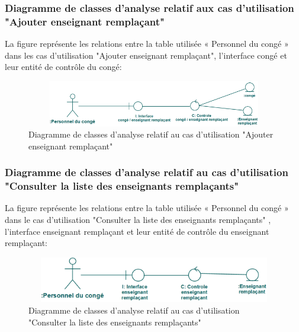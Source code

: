 \documentclass[12 pt ]{report}
\begin{document}
\subsubsection{Diagramme de classes d’analyse relatif aux cas d’utilisation "Ajouter enseignant remplaçant" }
La figure  représente les relations entre la table utilisée « Personnel du congé » dans les cas d’utilisation  "Ajouter enseignant remplaçant", l’interface  congé et  leur entité de  contrôle du congé:
\begin{figure}[h]
\begin{center}
\includegraphics[width= 12cm , height =2cm]{cla_con_rem.png}
\caption{Diagramme de classes d’analyse relatif au cas d’utilisation  "Ajouter enseignant remplaçant"}
\end{center}
\end{figure}
\newpage
\subsubsection{Diagramme de classes d’analyse relatif au cas d’utilisation "Consulter la liste des enseignants remplaçants" }
La figure  représente les relations entre la table utilisée « Personnel du congé » dans le cas d’utilisation  "Consulter la liste des enseignants remplaçants" , l’interface  enseignant remplaçant et  leur entité de  contrôle du enseignant remplaçant:
\begin{figure}[h]
\begin{center}
\includegraphics[width= 12cm , height =2cm]{cla_rem.png}
\caption{Diagramme de classes d’analyse relatif au cas d’utilisation "Consulter la liste des enseignants remplaçants"}
\end{center}
\end{figure}
\end{document}
